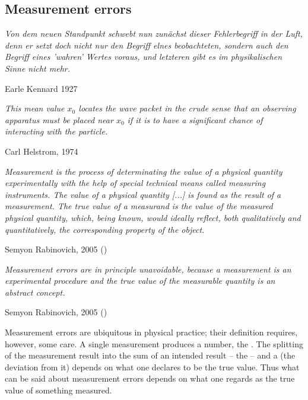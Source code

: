 \documentclass[12pt]{article}
\begin{document}
\subsection{Measurement errors}\label{ss.measErr}

\nopagebreak
\hfill\parbox[t]{10.8cm}{\footnotesize

{\em
Von dem neuen Standpunkt
schwebt nun zun\"achst dieser Fehlerbegriff in der Luft, denn er setzt
doch nicht nur den Begriff elnes beobachteten, sondern auch den
Begriff eines 'wahren' Wertes voraus, und letzteren gibt es im
physikalischen Sinne nicht mehr.}

\hfill Earle Kennard 1927 \cite[p.340]{Ken}
}

\bigskip


\nopagebreak
\hfill\parbox[t]{10.8cm}{\footnotesize

{\em This mean value $x_0$ locates the wave packet in the crude sense
that an observing apparatus must be placed near $x_0$ if it is to have
a significant chance of interacting with the particle.}

\hfill Carl Helstrom, 1974 \cite[p.454]{Hel74}
}

\bigskip


\nopagebreak
\hfill\parbox[t]{10.8cm}{\footnotesize

{\em Measurement is the process of determinating the value of a physical
quantity experimentally with the help of special technical means called
measuring instruments. The value of a physical quantity [...] is found 
as the result of a measurement.
The true value of a measurand is the value of the measured physical
quantity, which, being known, would ideally reflect, both qualitatively
and quantitatively, the corresponding property of the object.}

\hfill Semyon Rabinovich, 2005 (\cite[p.1f]{Rab})
}

\bigskip


\nopagebreak
\hfill\parbox[t]{10.8cm}{\footnotesize

{\em Measurement errors are in principle unavoidable, because a
measurement is an experimental procedure and the true value of the
measurable quantity is an abstract concept. }

\hfill Semyon Rabinovich, 2005 (\cite[p.11]{Rab})
}

\bigskip


Measurement errors are ubiquitous in physical practice; their
definition requires, however, some care. A single measurement produces
a number, the . The splitting of the measurement
result into the sum of an intended result -- the  -- and
a  (the deviation from it) depends on what one
declares to be the true value. Thus what can be said about measurement
errors depends on what one regards as the true value of something
measured.
\end{document}
